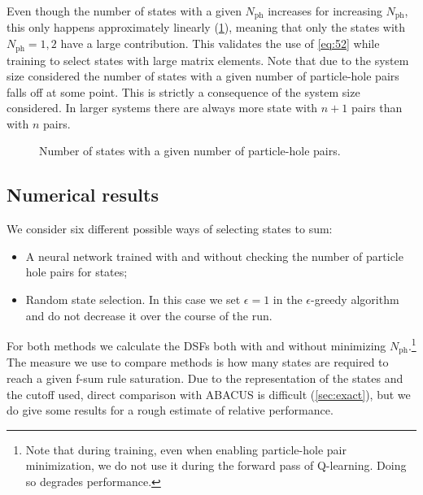 \documentclass[11pt, a4paper]{report} %
\begin{document}
Even though the number of states with a given \(N_{\mathrm{ph}}\) increases for increasing \(N_{\mathrm{ph}}\), this only happens approximately linearly (\cref{fig:numberofstatesph}), meaning that only the states with \(N_{\mathrm{ph}}=1,2\) have a large contribution.
This validates the use of \cref{eq:52} while training to select states with large matrix elements.
Note that due to the system size considered the number of states with a given number of particle-hole pairs falls off at some point.
This is strictly a consequence of the system size considered. 
In larger systems there are always more state with \(n+1\) pairs than with \(n\) pairs.
\begin{figure}[tb!]
  \centering
  \caption{Number of states with a given number of particle-hole pairs.}\label{fig:numberofstatesph}
\end{figure}




\subsection{Numerical results}


We consider six different possible ways of selecting states to sum:
\begin{itemize}
\item A neural network trained with and without checking the number of particle hole pairs for states;
\item Random state selection. In this case we set \(\epsilon=1\) in the \(\epsilon\)-greedy algorithm and do not decrease it over the course of the run.
\end{itemize}
For both methods we calculate the DSFs both with and without minimizing \(N_{\mathrm{ph}}\).\footnote{Note that during training, even when enabling particle-hole pair minimization, we do not use it during the forward pass of Q-learning. Doing so degrades performance.}
The measure we use to compare methods is how many states are required to reach a given f-sum rule saturation.
Due to the representation of the states and the cutoff used, direct comparison with ABACUS is difficult (\cref{sec:exact}), but we do give some results for a rough estimate of relative performance.
\end{document}
